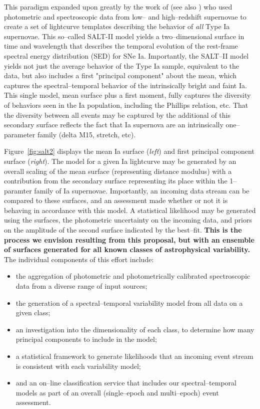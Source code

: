 This paradigm expanded upon greatly by the work of \cite{2007A&A...466...11G}
(see also \cite{2007ApJ...663.1187H}) who used  photometric and spectroscopic
data from low-- and high--redshift supernovae to create a set of lightcurve
templates describing the behavior of {\it all} Type Ia supernovae.  This
so--called SALT-II model yields a two--dimensional surface in time and
wavelength that describes the temporal evolution of the rest-frame spectral
energy distribution (SED) for SNe Ia. Importantly, the SALT--II model yields not
just the average behavior of the Type Ia sample, equivalent to the
\cite{2002PASP..114..803N} data, but also includes a first "principal component"
about the mean, which captures the spectral--temporal behavior of the
intrinsically bright and faint Ia.  This single model, mean surface plus a first
moment, fully captures the diversity of behaviors seen in the Ia population,
including the Phillips relation, etc.  That the diversity between all events may
be captured by the additional of this secondary surface reflects the fact that
Ia supernova are an intrinsically one--parameter family (delta M15, stretch,
etc).

Figure~\ref{fig:salt2} displays the mean Ia surface ({\it left}) and first
principal component surface ({\it right}).  The model for a given Ia lightcurve
may be generated by an overall scaling of the mean surface (representing
distance modulus) with a contribution from the secondary surface representing
its place within the 1--paramter family of Ia supernovae.  Importantly, an
incoming data stream can be compared to these surfaces, and an assessment made
whether or not it is behaving in accordance with this model.  A statistical
likelihood may be generated using the surfaces, the photometric uncertainty on
the incoming data, and priors on the amplitude of the second surface indicated
by the best--fit.  {\bf This is the process we envision resulting from this
proposal, but with an ensemble of surfaces generated for all known classes of
astrophysical variability.}  The individual components of this effort include:

\begin{itemize}

\item the aggregation of photometric and photometrically calibrated
spectroscopic data from a diverse range of input sources;

\item the generation of a spectral--temporal variability model from all data on
a given class;

\item an investigation into the dimensionality of each class, to determine how
many principal components to include in the model;

\item a statistical framework to generate likelihoods that an incoming event
stream is consistent with each variability model;

\item and an on--line classification service that includes our
spectral--temporal models as part of an overall (single--epoch and multi--epoch)
event assessment.

\end{itemize}

